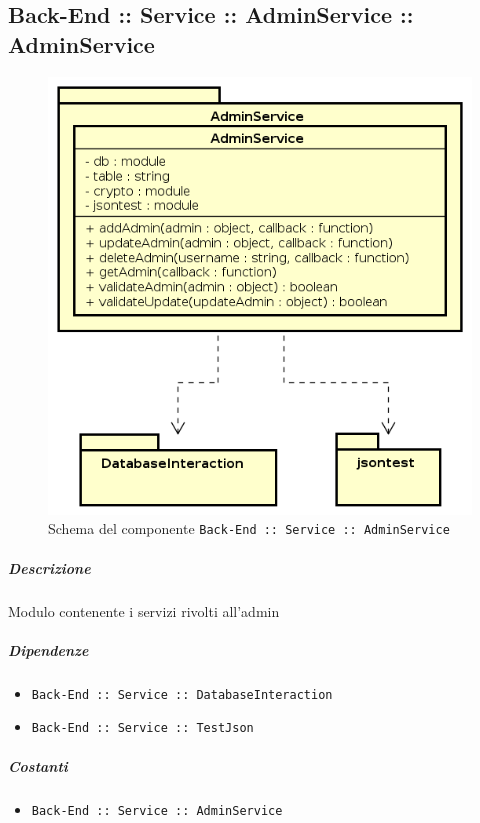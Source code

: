 \documentclass[../ManualeSviluppatore_v1.0.0.tex]{subfiles}
\begin{document}
\subsection{Back-End :: Service :: AdminService :: AdminService}
\begin{figure}[!h]
	\centering
	\includegraphics[scale=0.6]{Architettura/Back-End/Service/AdminService.png}
	\caption{Schema del componente \texttt{Back-End :: Service :: AdminService}}
\end{figure}
\subparagraph{Descrizione} Modulo contenente i servizi rivolti all'admin
\subparagraph{Dipendenze}
\begin{itemize}
	\item \texttt{Back-End :: Service :: DatabaseInteraction}
	\item \texttt{Back-End :: Service :: TestJson}
\end{itemize}
\subparagraph{Costanti}
\begin{itemize}
	\item \texttt{Back-End :: Service :: AdminService}
\end{itemize}
\end{document}
